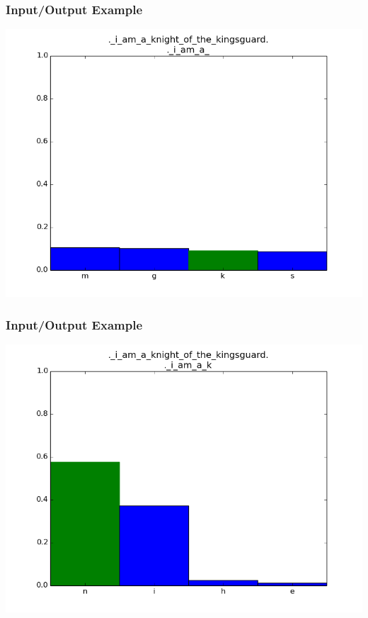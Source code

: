 \documentclass[12]{beamer}
\begin{document}
\begin{frame}
\frametitle{Input/Output Example}
\begin{center}
\includegraphics[scale=0.4]{../distplot/08.png}
\end{center}
\end{frame}

\begin{frame}
\frametitle{Input/Output Example}
\begin{center}
\includegraphics[scale=0.4]{../distplot/09.png}
\end{center}
\end{frame}
\end{document}
